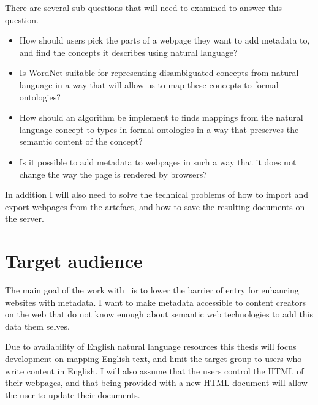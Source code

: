 There are several sub questions that will need to examined to answer this question.
\begin{itemize}
	\item How should users pick the parts of a webpage they want to add metadata to, and find the concepts it describes using natural language?
	\item Is WordNet suitable for representing disambiguated concepts from natural language in a way that will allow us to map these concepts to formal ontologies?
	\item How should an algorithm be implement to finds mappings from the natural language concept to types in
			formal ontologies in a way that preserves the semantic content of the concept?
	\item Is it possible to add metadata to webpages in such a way that it does not change the way the page is rendered by browsers?
\end{itemize}

In addition I will also need to solve the technical problems of how to import and export webpages from the artefact,
and how to save the resulting documents on the server.

\section{Target audience}
The main goal of the work with \theartefact\ is to lower the barrier of entry for enhancing websites with metadata.
I want to make metadata accessible to content creators on the web that do not know enough about semantic web technologies
to add this data them selves.

Due to availability of English natural language resources this thesis will focus development on mapping English text,
and limit the target group to users who write content in English.
I will also assume that the users control the HTML of their webpages,
and that being provided with a new HTML document will allow the user to update their documents.

